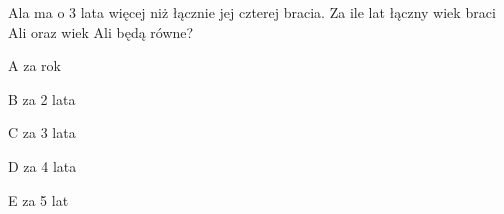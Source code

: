 \begin{tresc}
Ala ma o 3 lata więcej niż łącznie jej czterej bracia. Za ile lat łączny wiek braci Ali oraz wiek Ali będą równe?
\end{tresc}
\begin{wariant}{A} za rok \end{wariant}
\begin{wariant}{B} za 2 lata \end{wariant}
\begin{wariant}{C} za 3 lata \end{wariant}
\begin{wariant}{D} za 4 lata \end{wariant}
\begin{wariant}{E} za 5 lat \end{wariant}
